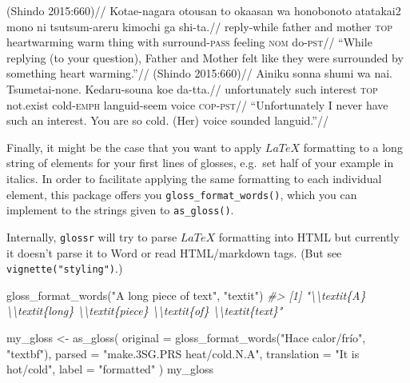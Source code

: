 \documentclass[
]{article}
\newenvironment{Shaded}{\begin{snugshade}}{\end{snugshade}}
\newcommand{\AttributeTok}[1]{\textcolor[rgb]{0.77,0.63,0.00}{#1}}
\newcommand{\CommentTok}[1]{\textcolor[rgb]{0.56,0.35,0.01}{\textit{#1}}}
\newcommand{\FunctionTok}[1]{\textcolor[rgb]{0.00,0.00,0.00}{#1}}
\newcommand{\NormalTok}[1]{#1}
\newcommand{\OtherTok}[1]{\textcolor[rgb]{0.56,0.35,0.01}{#1}}
\newcommand{\StringTok}[1]{\textcolor[rgb]{0.31,0.60,0.02}{#1}}
\begin{document}
\pex\label{jp} \a\label{heartwarming-jp} \begingl \glpreamble (Shindo 2015:660)// \gla Kotae-nagara otousan to okaasan wa honobonoto atatakai2 mono ni tsutsum-areru kimochi ga shi-ta.// \glb reply-while father and mother \textsc{top} heartwarming warm thing with surround-\textsc{pass} feeling \textsc{nom} do-\textsc{pst}// \glft ``While replying (to your question), Father and Mother felt like they were surrounded by something heart warming.''//
\endgl 
\a\label{languid-jp} \begingl \glpreamble (Shindo 2015:660)// \gla Ainiku sonna shumi wa nai. Tsumetai-none. Kedaru-souna koe da-tta.// \glb unfortunately such interest \textsc{top} not.exist cold-\textsc{emph} languid-seem voice \textsc{cop-pst}// \glft ``Unfortunately I never have such an interest. You are so cold. (Her) voice sounded languid.''//
\endgl  \xe 

Finally, it might be the case that you want to apply \(LaTeX\) formatting to a long string of elements for your first lines of glosses, e.g.~set half of your example in italics. In order to facilitate applying the same formatting to each individual element, this package offers you \texttt{gloss\_format\_words()}, which you can implement to the strings given to \texttt{as\_gloss()}.

Internally, \texttt{glossr} will try to parse \(LaTeX\) formatting into HTML but currently it doesn't parse it to Word or read HTML/markdown tags. (But see \texttt{vignette("styling")}.)

\begin{Shaded}
\begin{Highlighting}[]
\FunctionTok{gloss\_format\_words}\NormalTok{(}\StringTok{"A long piece of text"}\NormalTok{, }\StringTok{"textit"}\NormalTok{)}
\CommentTok{\#\textgreater{} [1] "\textbackslash{}\textbackslash{}textit\{A\} \textbackslash{}\textbackslash{}textit\{long\} \textbackslash{}\textbackslash{}textit\{piece\} \textbackslash{}\textbackslash{}textit\{of\} \textbackslash{}\textbackslash{}textit\{text\}"}
\end{Highlighting}
\end{Shaded}

\begin{Shaded}
\begin{Highlighting}[]
\NormalTok{my\_gloss }\OtherTok{\textless{}{-}} \FunctionTok{as\_gloss}\NormalTok{(}
  \AttributeTok{original =} \FunctionTok{gloss\_format\_words}\NormalTok{(}\StringTok{"Hace calor/frío"}\NormalTok{, }\StringTok{"textbf"}\NormalTok{),}
  \AttributeTok{parsed =} \StringTok{"make.3SG.PRS heat/cold.N.A"}\NormalTok{,}
  \AttributeTok{translation =} \StringTok{"\textquotesingle{}It is hot/cold\textquotesingle{}"}\NormalTok{,}
  \AttributeTok{label =} \StringTok{"formatted"}
\NormalTok{)}
\NormalTok{my\_gloss}
\end{Highlighting}
\end{Shaded}
\end{document}
